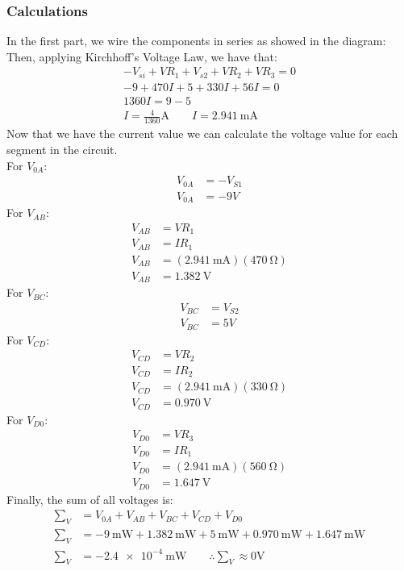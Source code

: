 \documentclass[a4paper]{article}
\begin{document}
\subsubsection{Calculations}
In the first part, we wire the components in series as showed in the diagram:
Then, applying Kirchhoff's Voltage Law, we have that:
\begin{gather*}
    -V_{si}+VR_1+V_{s2}+VR_2+VR_3=0\\
    -9+470I+5+330I+56I=0\\
    1360I=9-5\\
    I=\frac{4}{1360}\si{\ampere}\qquad I=\SI{2.941}{\milli\ampere}
\end{gather*}
Now that we have the current value we can calculate the voltage value for each segment in the
circuit.\\
For $V_{0A}$:
\begin{align*}
    V_{0A}&=-V_{S1}\\
    V_{0A}&=-9V
\end{align*}
For $V_{AB}$:
\begin{align*}
    V_{AB}&=VR_1\\
    V_{AB}&=IR_1\\
    V_{AB}&=(\SI{2.941}{\milli\ampere})(\SI{470}{\ohm})\\
    V_{AB}&=\SI{1.382}{\volt}
\end{align*}
For $V_{BC}$:
\begin{align*}
    V_{BC}&=V_{S2}\\
    V_{BC}&=5V
\end{align*}
For $V_{CD}$:
\begin{align*}
    V_{CD}&=VR_2\\
    V_{CD}&=IR_2\\
    V_{CD}&=(\SI{2.941}{\milli\ampere})(\SI{330}{\ohm})\\
    V_{CD}&=\SI{0.970}{\volt}
\end{align*}
For $V_{D0}$:
\begin{align*}
    V_{D0}&=VR_3\\
    V_{D0}&=IR_1\\
    V_{D0}&=(\SI{2.941}{\milli\ampere})(\SI{560}{\ohm})\\
    V_{D0}&=\SI{1.647}{\volt}
\end{align*}
Finally, the sum of all voltages is:
\begin{align*}
    \sum\nolimits_{V}&=V_{0A}+V_{AB}+V_{BC}+V_{CD}+V_{D0}\\
    \sum\nolimits_{V}&=-\SI{9}{\milli\watt}+\SI{1.382}{\milli\watt}+\SI{5}{\milli\watt}+\SI{0.970}{\milli\watt}+\SI{1.647}{\milli\watt}\\
    \sum\nolimits_{V}&=\SI{-2.4e-4}{\milli\watt}\qquad
    \therefore\sum\nolimits_{V}\approx 0\si{\volt}
\end{align*}
\end{document}
